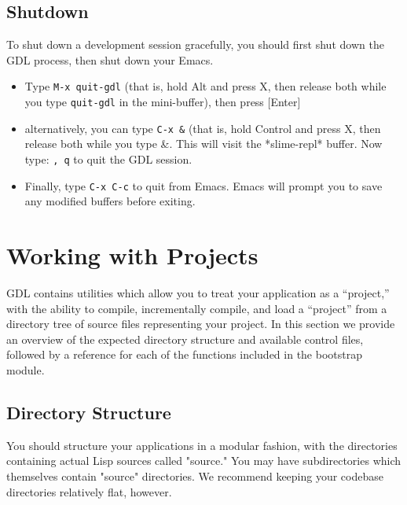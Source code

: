 \documentclass [11pt]{book}
\begin{document}
\subsection{Shutdown}

\label{subsec:shutdown}

 To shut down a development session gracefully, you should first shut down the GDL process,
then shut down your Emacs.

\begin{itemize}

\item Type \texttt{M-x quit-gdl} (that is, hold Alt and press X, then release both while you type \texttt{quit-gdl} in the mini-buffer), then press [Enter]

\item alternatively, you can type \texttt{C-x \&} (that is, hold Control and press X, then release both while you type \&. 
This will visit the *slime-repl* buffer. Now type: \texttt{, q} to quit the GDL session.

\item Finally, type \texttt{C-x C-c} to quit from Emacs. Emacs will prompt you to save any
	   modified buffers before exiting.

\end{itemize}



\section{Working with Projects}

\label{sec:workingwithprojects}

GDL contains utilities which allow you to treat your
application as a ``project,'' with the ability to compile,
incrementally compile, and load a ``project'' from a directory tree of
source files representing your project. In this section we provide an
overview of the expected directory structure and available control
files, followed by a reference for each of the functions included in
the bootstrap module.

\subsection{Directory Structure}

\label{subsec:directorystructure}



You should structure your applications in a modular
fashion, with the directories containing actual Lisp sources called
"source." You may have subdirectories which themselves contain
"source" directories. We recommend keeping your codebase directories
relatively flat, however.
\end{document}
